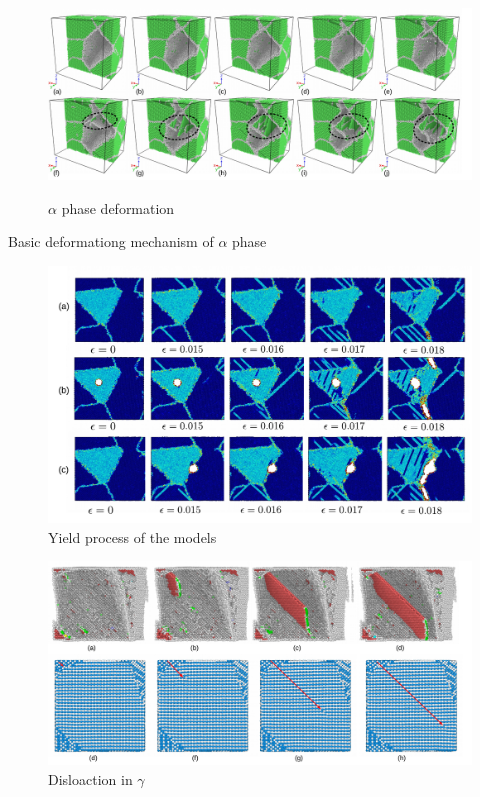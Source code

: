 \documentclass[journal,article,submit,moreauthors,pdftex,10pt,a4paper]{Definitions/mdpi}
\begin{document}
	\begin{figure}[h]
		\centering
		\includegraphics[width=1\linewidth]{img/def-alpha}
		\label{fig:def-alpha}
		\caption{$\alpha$ phase deformation}
	\end{figure}
Basic deformationg mechanism of $\alpha$ phase 
	
	\begin{figure}[h]
		\centering
		\includegraphics[width=1\linewidth]{"img/fracture3"}
		\caption{Yield process of the models}
		\label{fig:yield}
	\end{figure}
	
	\begin{figure}[h]
		\centering
		\includegraphics[width=1\linewidth]{"img/disl-gamma"}
		\caption{Disloaction in $\gamma$}
		\label{fig:dis-alpha}
	\end{figure}
\end{document}
